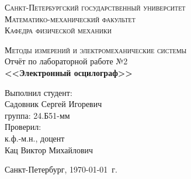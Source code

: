 \begin{titlepage}
\begin{center}
\textsc{Санкт-Петербургский государственный университет\\
Математико-механический факультет\\
Кафедра физической механики\\}

\vfill

\textsc{Методы измерений и электромеханические системы\\[3mm]}
Отчёт по лабораторной работе №2\\[6mm]


\textbf{\large<<Электронный осцилограф>>}

\vfill
\end{center}

\hfill
\begin{minipage}{.5\textwidth}
Выполнил студент:\\[2mm] 
Садовник Сергей Игоревич\\
группа: 24.Б51-мм\\[5mm]

Проверил:\\[2mm] 
к.ф.-м.н., доцент\\
Кац Виктор Михайлович
\end{minipage}%
\vfill
\begin{center}
 Санкт-Петербург, \yeardate\today\ г.
\end{center}
\end{titlepage}